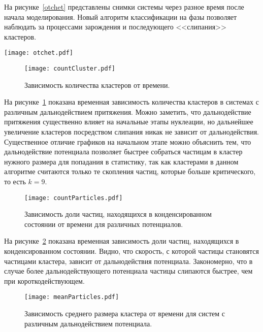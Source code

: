 На рисунке~\ref{otchet} представлены снимки системы через разное время после начала моделирования. Новый алгоритм классификации на фазы позволяет наблюдать за процессами зарождения и последующего <<слипания>> кластеров.



\begin{figure*}[!t]
	 \centering
	 \texttt{[image: otchet.pdf]}
	 \caption{Процесс зарождения и роста кластеров в переохлажденной системе частиц взаимодействующих посредством потенциала Леннарда-Джонса.}
	 \label{otchet}
\end{figure*}


\begin{figure}[!t]
    \centering
    \texttt{[image: countCluster.pdf]}
    \caption{Зависимость количества кластеров от времени.}
    \label{countCluster}
\end{figure}

На рисунке~\ref{countCluster} показана временная зависимость количества кластеров в системах с различным дальнодействием притяжения. Можно заметить, что дальнодействие притяжения существенно влияет на начальные этапы нуклеации, но дальнейшее увеличение кластеров посредством слипания никак не зависит от дальнодействия. Существенное отличие графиков на начальном этапе можно объяснить тем, что дальнодействие потенциала позволяет быстрее собраться частицам в кластер нужного размера для попадания в статистику, так как кластерами в данном алгоритме считаются только те скопления частиц, которые больше критического, то есть $k = 9$.

\begin{figure}[!t]
    \centering
    \texttt{[image: countParticles.pdf]}
    \caption{Зависимость доли частиц, находящихся в конденсированном состоянии от времени для различных потенциалов.}
    \label{countParticles}
\end{figure}

На рисунке~\ref{countParticles} показана временная зависимость доли частиц, находящихся в конденсированном состоянии. Видно, что скорость, с которой частицы становятся частицами кластера, зависит от дальнодействия потенциала. Закономерно, что в случае более дальнодействующего потенциала частицы слипаются быстрее, чем при короткодействующем.

\begin{figure}[!t]
    \centering
    \texttt{[image: meanParticles.pdf]}
    \caption{Зависимость среднего размера кластера от времени для систем с различным дальнодействием потенциала.}
    \label{meanParticles}
\end{figure}

